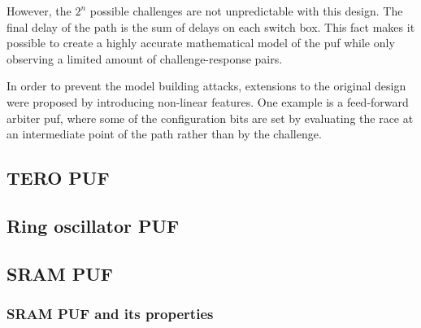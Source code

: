 However, the $2^n$ possible challenges are not unpredictable with this design. The final delay of the path is the sum of delays on each switch box. This fact makes it possible to create a highly accurate mathematical model of the \gls{puf} while only observing a limited amount of challenge-response pairs.\cite{Lee2004}

In order to prevent the model building attacks, extensions to the original design were proposed by introducing non-linear features. One example is a feed-forward arbiter \gls{puf}, where some of the configuration bits are set by evaluating the race at an intermediate point of the path rather than by the challenge.\cite{Lee2005}

\subsection{TERO PUF}
\subsection{Ring oscillator PUF}
\subsection{SRAM PUF}
\subsubsection*{SRAM PUF and its properties}\label{sec:srampuf_properties}

